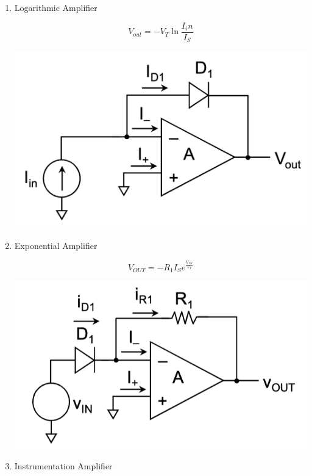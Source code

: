 \begin{enumerate}
\begin{minipage}{0.5\textwidth}
    \end{minipage}
    \item Logarithmic Amplifier \\
    \begin{minipage}{0.5\textwidth}
        \begin{equation}
        V_{out} = -V_T\ln{\frac{I_in}{I_S}}
    \end{equation}
    \end{minipage}
    \begin{minipage}{0.5\textwidth}
        \includegraphics[width=0.7\linewidth]{image/logamp.png}
    \end{minipage}
    \item Exponential Amplifier \\
    \begin{minipage}{0.5\textwidth}
        \begin{equation}
        V_{OUT} = -R_1I_Se^{\frac{V_{IN}}{V_T}}
    \end{equation}
    \end{minipage}
    \begin{minipage}{0.5\textwidth}
        \includegraphics[width=0.7\linewidth]{image/expamp.png}
    \end{minipage}
    \item Instrumentation Amplifier \\
    \begin{minipage}{0.5\textwidth}
        \begin{equation}

\end{equation}
\end{minipage}
\end{enumerate}
